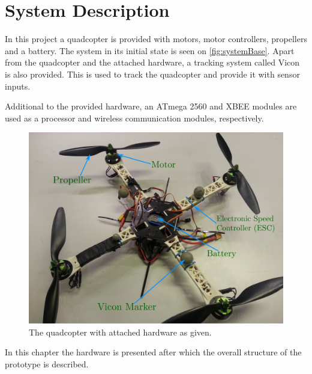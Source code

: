 \chapter{System Description}
In this project a quadcopter is provided with motors, motor controllers, propellers and a battery. The system in its initial state is seen on \autoref{fig:systemBase}. Apart from the quadcopter and the attached hardware, a tracking system called Vicon is also provided. This is used to track the quadcopter and provide it with sensor inputs.

Additional to the provided hardware, an ATmega 2560 and XBEE modules are used as a processor and wireless communication modules, respectively.

\begin{figure}[H]
  \centering
  \includegraphics[width=.6\linewidth]{figures/quadcopterBaseLabels}
  \caption{The quadcopter with attached hardware as given.}
  \label{fig:systemBase}
\end{figure}

In this chapter the hardware is presented after which the overall structure of the prototype is described.